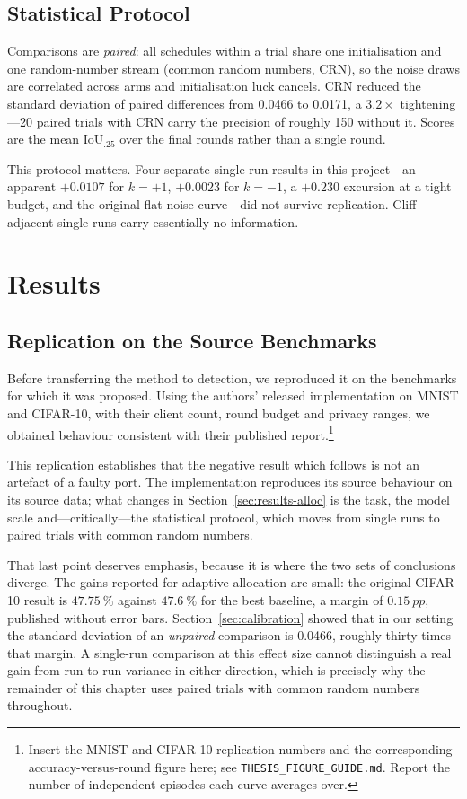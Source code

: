 \section{Statistical Protocol}

Comparisons are \emph{paired}: all schedules within a trial share one
initialisation and one random-number stream (common random numbers, CRN), so the
noise draws are correlated across arms and initialisation luck cancels. CRN
reduced the standard deviation of paired differences from \num{0.0466} to
\num{0.0171}, a $3.2\times$ tightening---\num{20} paired trials with CRN carry
the precision of roughly \num{150} without it. Scores are the mean IoU$_{.25}$
over the final rounds rather than a single round.

This protocol matters. Four separate single-run results in this project---an
apparent $+0.0107$ for $k=+1$, $+0.0023$ for $k=-1$, a $+0.230$ excursion at a
tight budget, and the original flat noise curve---did not survive replication.
Cliff-adjacent single runs carry essentially no information.


\chapter{Results}

\section{Replication on the Source Benchmarks}
\label{sec:replication}

Before transferring the method to detection, we reproduced it on the benchmarks
for which it was proposed. Using the authors' released implementation on MNIST
and CIFAR-10, with their client count, round budget and privacy ranges, we
obtained behaviour consistent with their published report.\footnote{Insert the
MNIST and CIFAR-10 replication numbers and the corresponding accuracy-versus-round
figure here; see \texttt{THESIS\_FIGURE\_GUIDE.md}. Report the number of
independent episodes each curve averages over.}

This replication establishes that the negative result which follows is not an
artefact of a faulty port. The implementation reproduces its source behaviour on
its source data; what changes in Section~\ref{sec:results-alloc} is the task, the
model scale and---critically---the statistical protocol, which moves from single
runs to paired trials with common random numbers.

That last point deserves emphasis, because it is where the two sets of
conclusions diverge. The gains reported for adaptive allocation are small: the
original CIFAR-10 result is $\SI{47.75}{\percent}$ against $\SI{47.6}{\percent}$
for the best baseline, a margin of $\SI{0.15}{pp}$, published without error bars.
Section~\ref{sec:calibration} showed that in our setting the standard deviation
of an \emph{unpaired} comparison is \num{0.0466}, roughly thirty times that
margin. A single-run comparison at this effect size cannot distinguish a real
gain from run-to-run variance in either direction, which is precisely why the
remainder of this chapter uses paired trials with common random numbers
throughout.

